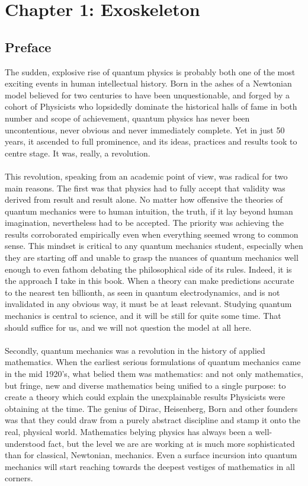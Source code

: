 \chapter{Chapter 1: Exoskeleton}
\section{Preface}
The sudden, explosive rise of quantum physics is probably both one of the most exciting events in human intellectual history. Born in the ashes of a Newtonian model believed for two centuries to have been unquestionable, and forged by a cohort of Physicists who lopsidedly dominate the historical halls of fame in both number and scope of achievement, quantum physics has never been uncontentious, never obvious and never immediately complete. Yet in just 50 years, it ascended to full prominence, and its ideas, practices and results took to centre stage. It was, really, a revolution.
\\\\
This revolution, speaking from an academic point of view, was radical for two main reasons. The first was that physics had to fully accept that validity was derived from result and result alone. No matter how offensive the theories of quantum mechanics were to human intuition, the truth, if it lay beyond human imagination, nevertheless had to be accepted. The priority was achieving the results corroborated empirically even when everything seemed wrong to common sense. This mindset is critical to any quantum mechanics student, especially when they are starting off and unable to grasp the nuances of quantum mechanics well enough to even fathom debating the philosophical side of its rules. Indeed, it is the approach I take in this book. When a theory can make predictions accurate to the nearest ten billionth, as seen in quantum electrodynamics, and is not invalidated in any obvious way, it must be at least relevant. Studying quantum mechanics is central to science, and it will be still for quite some time. That should suffice for us, and we will not question the model at all here.
\\\\
Secondly, quantum mechanics was a revolution in the history of applied mathematics. When the earliest serious formulations of quantum mechanics came in the mid 1920's, what belied them was mathematics: and not only mathematics, but fringe, new and diverse mathematics being unified to a single purpose: to create a theory which could explain the unexplainable results Physicists were obtaining at the time. The genius of Dirac, Heisenberg, Born and other founders was that they could draw from a purely abstract discipline and stamp it onto the real, physical world. Mathematics belying physics has always been a well-understood fact, but the level we are are working at is much more sophisticated than for classical, Newtonian, mechanics. Even a surface incursion into quantum mechanics will start reaching towards the deepest vestiges of mathematics in all corners.
